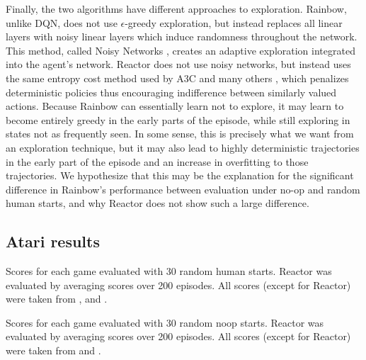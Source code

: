 \documentclass{article}
\begin{document}
Finally, the two algorithms have different approaches to exploration. 
Rainbow, unlike DQN, does not use $\epsilon$-greedy exploration, but instead 
replaces all linear layers with noisy linear layers which induce randomness 
throughout the network. This method, called Noisy Networks 
\citep{fortunato2017noisy}, creates an adaptive exploration integrated into the 
agent's network. Reactor does not use noisy networks, but instead uses the same 
entropy cost method used by A3C and many others \citep{mnih2016asynchronous}, 
which penalizes deterministic policies thus encouraging indifference between 
similarly valued actions. Because Rainbow can essentially learn not to explore, 
it may learn to become entirely greedy in the early parts of the episode, while 
still exploring in states not as frequently seen. In some sense, this is 
precisely what we want from an exploration technique, but it may also lead to 
highly deterministic trajectories in the early part of the episode and an 
increase in overfitting to those trajectories. We hypothesize that this may be 
the explanation for the significant difference in Rainbow's performance between 
evaluation under no-op and random human starts, and why Reactor does not show 
such a large difference.


\subsection{Atari results}

\begin{table}[h]
\caption{Scores for each game evaluated with 30 random human starts. Reactor 
was evaluated by averaging scores over 200 episodes. All scores (except for 
Reactor) were taken from \cite{wang2015dueling}, \cite{mnih2016asynchronous} 
and 
\cite{rainbow}.}
\label{raw-scores-human}
\begin{scriptsize}
\begin{sc}
\tiny

\end{sc}
\end{scriptsize}
\end{table}

\begin{table}[h]
\caption{Scores for each game evaluated with 30 random noop starts. Reactor 
was evaluated by averaging scores over 200 episodes. All scores (except for 
Reactor) were taken from \cite{wang2015dueling} and \cite{rainbow}.}
\label{raw-scores-noop}
\begin{scriptsize}
\begin{sc}
\tiny

\end{sc}
\end{scriptsize}
\end{table}
\end{document}
